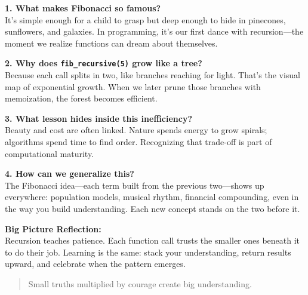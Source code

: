 \textbf{1. What makes Fibonacci so famous?}\\
It’s simple enough for a child to grasp but deep enough to hide in pinecones, sunflowers, and galaxies.  
In programming, it’s our first dance with recursion—the moment we realize functions can dream about themselves.

\vspace{0.8em}
\textbf{2. Why does \texttt{fib\_recursive(5)} grow like a tree?}\\
Because each call splits in two, like branches reaching for light.  
That’s the visual map of exponential growth.  
When we later prune those branches with memoization, the forest becomes efficient.

\vspace{0.8em}
\textbf{3. What lesson hides inside this inefficiency?}\\
Beauty and cost are often linked.  
Nature spends energy to grow spirals; algorithms spend time to find order.  
Recognizing that trade-off is part of computational maturity.

\vspace{0.8em}
\textbf{4. How can we generalize this?}\\
The Fibonacci idea—each term built from the previous two—shows up everywhere: population models, musical rhythm, financial compounding, even in the way you build understanding.  
Each new concept stands on the two before it.  

\vspace{0.8em}
\textbf{Big Picture Reflection:}\\
Recursion teaches patience.  
Each function call trusts the smaller ones beneath it to do their job.  
Learning is the same: stack your understanding, return results upward, and celebrate when the pattern emerges.  
\begin{quote}
Small truths multiplied by courage create big understanding.
\end{quote}

